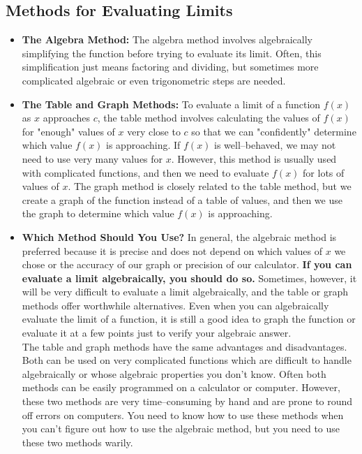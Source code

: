 \subsection*{Methods for Evaluating Limits}%
\begin{itemize}[leftmargin=*]
    \item \textbf{The Algebra Method:} The algebra method involves algebraically simplifying the function before trying to evaluate its limit. Often, this simplification just means factoring and dividing, but sometimes more complicated algebraic or even trigonometric steps are needed.
    \item \textbf{The Table and Graph Methods:} To evaluate a limit of a function $f(x)$ as $x$ approaches $c$, the table method involves calculating the values of $f(x)$ for "enough" values of $x$ very close to $c$ so that we can "confidently" determine which value $f(x)$ is approaching. If $f(x)$ is well–behaved, we may not need to use very many values for $x$. However, this method is usually used with complicated functions, and then we need to evaluate $f(x)$ for lots of values of $x$. The graph method is closely related to the table method, but we create a graph of the function instead of a table of values, and then we use the graph to determine which value $f(x)$ is approaching.
     \item \textbf{Which Method Should You Use?} In general, the algebraic method is preferred because it is precise and does not depend on which values of $x$ we chose or the accuracy of our graph or precision of our calculator. \textbf{If you can evaluate a limit algebraically, you should do so.} Sometimes, however, it will be very difficult to evaluate a limit algebraically, and the table or graph methods offer worthwhile alternatives. Even when you can algebraically evaluate the limit of a function, it is still a good idea to graph the function or evaluate it at a few points just to verify your algebraic answer. \\The table and graph methods have the same advantages and disadvantages. Both can be used on very complicated functions which are difficult to handle algebraically or whose algebraic properties you don't know. Often both methods can be easily programmed on a calculator or computer. However, these two methods are very time–consuming by hand and are prone to round off errors on computers. You need to know how to use these methods when you can't figure out how to use the algebraic method, but you need to use these two methods warily.
\end{itemize}

